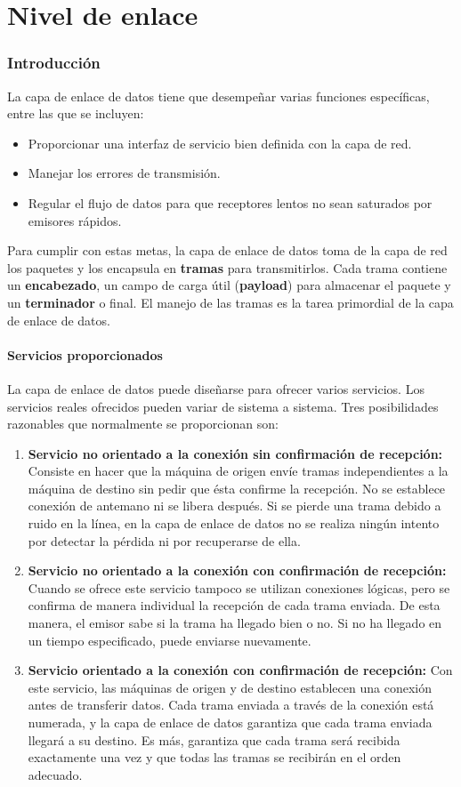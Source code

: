 \part{Nivel de enlace}
\section{Introducción}
La capa de enlace de datos tiene que desempeñar varias funciones específicas, entre las que
se incluyen:
\begin{itemize}
  \item Proporcionar una interfaz de servicio bien definida con la capa de red.
  \item Manejar los errores de transmisión.
  \item Regular el flujo de datos para que receptores lentos no sean saturados por emisores rápidos.
\end{itemize}
Para cumplir con estas metas, la capa de enlace de datos toma de la capa de red los paquetes y los encapsula en \textbf{tramas} para transmitirlos. Cada trama contiene un \textbf{encabezado}, un campo de carga útil (\textbf{payload}) para almacenar el paquete y un \textbf{terminador} o final. El manejo de las tramas es la tarea primordial de la capa de enlace de datos.

\subsection{Servicios proporcionados}
La capa de enlace de datos puede diseñarse para ofrecer varios servicios. Los servicios reales
ofrecidos pueden variar de sistema a sistema. Tres posibilidades razonables que normalmente se
proporcionan son:
\begin{enumerate}
  \item \textbf{Servicio no orientado a la conexión sin confirmación de recepción:} Consiste en hacer que la máquina de origen envíe tramas independientes a la máquina de destino sin pedir que ésta confirme la recepción. No se establece conexión de antemano ni se libera después. Si se pierde una trama debido a ruido en la línea, en la capa de enlace de datos no se realiza ningún intento por detectar la pérdida ni por recuperarse de ella.
  \item \textbf{Servicio no orientado a la conexión con confirmación de recepción:} Cuando se ofrece este servicio tampoco se utilizan conexiones lógicas, pero se confirma de manera individual la recepción de cada trama enviada. De esta manera, el emisor sabe si la trama ha llegado bien o no. Si no ha llegado en un tiempo especificado, puede enviarse nuevamente.
  \item \textbf{Servicio orientado a la conexión con confirmación de recepción:} Con este servicio, las máquinas de origen y de destino establecen una conexión antes de transferir datos. Cada trama enviada a través de la conexión está numerada, y la capa de enlace de datos garantiza que cada trama enviada llegará a su destino. Es más, garantiza que cada trama será recibida exactamente una vez y que todas las tramas se recibirán en el orden adecuado.
\end{enumerate}

